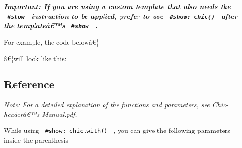 \emph{\textbf{Important: If you are using a custom template that also
needs the \texttt{\ \#show\ } instruction to be applied, prefer to use
\texttt{\ \#show:\ chic()\ } after the templateâ€™s \texttt{\ \#show\ }
.}}

For example, the code belowâ€¦

\begin{Shaded}
\begin{Highlighting}[]


\NormalTok{    ),}
\NormalTok{  ),}
\NormalTok{  ),}
\NormalTok{)}


\end{Highlighting}
\end{Shaded}

â€¦will look like this:

\subsubsection{\texorpdfstring{\protect{}}{Usage example}}\label{usage-example}

\subsection{Reference}\label{reference}

\emph{Note: For a detailed explanation of the functions and parameters,
see Chic-headerâ€™s Manual.pdf.}

While using \texttt{\ \#show:\ chic.with()\ } , you can give the
following parameters inside the parenthesis:


